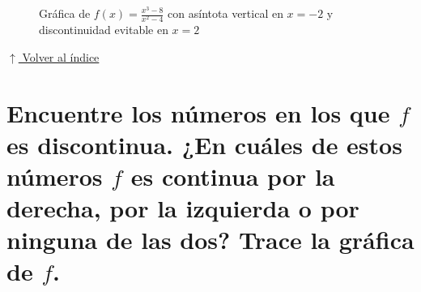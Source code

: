 \documentclass[12pt]{article}
\newcommand{\volverindice}{%
    \vspace{1em}%
    \begin{flushright}%
        \hyperlink{indice}{\small $\uparrow$ Volver al índice}%
    \end{flushright}%
}
\begin{document}
\begin{enumerate}[label=\alph*)]
\begin{figure}[H]
    \caption{Gráfica de $f(x) = \frac{x^3-8}{x^2-4}$ con asíntota vertical en $x=-2$ y discontinuidad evitable en $x=2$}
    \label{fig:funcion_12b}
    \end{figure}

\end{enumerate}

\volverindice
\newpage

\section[Números de discontinuidad]{Encuentre los números en los que $f$ es discontinua. ¿En cuáles de estos números $f$ es continua por la derecha, por la izquierda o por ninguna de las dos? Trace la gráfica de $f$.}
\end{document}

